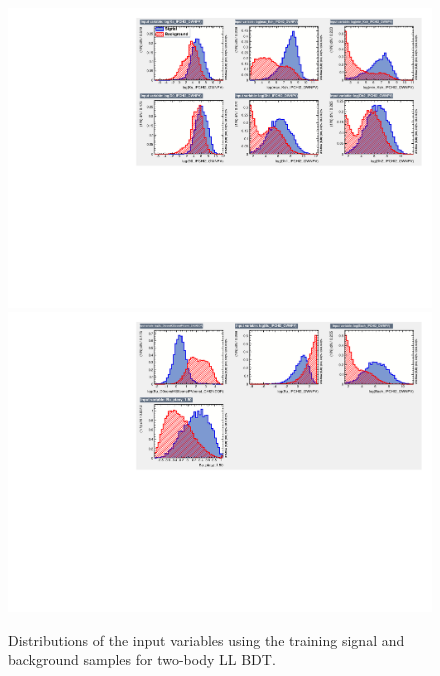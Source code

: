 \begin{figure}
\centering
\includegraphics[width=\linewidth]{figures/selection/inputvariables_KPi_LL_run1_1.pdf}
\includegraphics[width=\linewidth]{figures/selection/inputvariables_KPi_LL_run1_2.pdf}
\caption{Distributions of the input variables using the training signal and background samples for two-body LL BDT.}
\label{BDTinputdist2bodyLL}
\end{figure}

